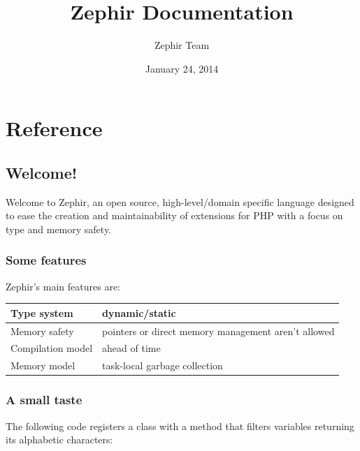 \documentclass[letterpaper,10pt,english]{sphinxmanual}
\title{Zephir Documentation}
\date{January 24, 2014}
\author{Zephir Team}
\begin{document}
\maketitle
\tableofcontents
{}\label{index::doc}



\chapter{Reference}
\label{index:zephir-language}\label{index:reference}

\section{Welcome!}
\label{welcome:welcome}\label{welcome::doc}
Welcome to Zephir, an open source, high-level/domain specific language
designed to ease the creation and maintainability of extensions for PHP
with a focus on type and memory safety.


\subsection{Some features}
\label{welcome:some-features}
Zephir's main features are:

\begin{tabulary}{\linewidth}{|L|L|}
\hline

Type system
 & 
dynamic/static
\\\hline

Memory safety
 & 
pointers or direct memory management aren't allowed
\\\hline

Compilation model
 & 
ahead of time
\\\hline

Memory model
 & 
task-local garbage collection
\\\hline
\end{tabulary}



\subsection{A small taste}
\label{welcome:a-small-taste}
The following code registers a class with a method that filters variables returning its
alphabetic characters:
\end{document}
